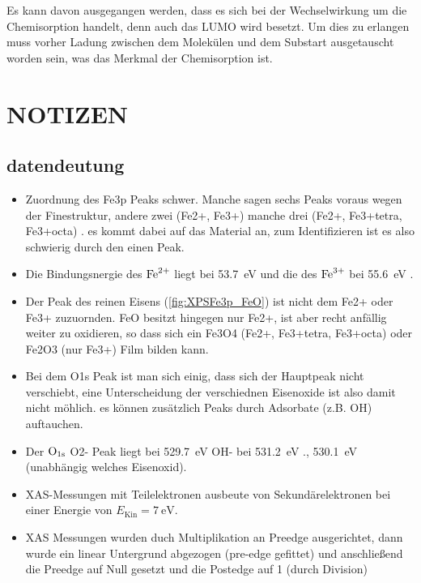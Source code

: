         Es kann davon ausgegangen werden, dass es sich bei der Wechselwirkung um die Chemisorption handelt, denn auch das LUMO wird besetzt.
        Um dies zu erlangen muss vorher Ladung zwischen dem Molekülen und dem Substart ausgetauscht worden sein, was das Merkmal der Chemisorption ist.

  
    \section{NOTIZEN}
    \subsection{datendeutung}
        \begin{itemize}
            \item Zuordnung des Fe3p Peaks schwer. Manche sagen sechs Peaks voraus \cite{FeO_14, FeO_17, FeO_15} wegen der Finestruktur, andere zwei (Fe2+, Fe3+) \cite{FeO_15, FeO_11, FeO_10, FeO_7} manche drei (Fe2+, Fe3+tetra, Fe3+octa) \cite{FeO_12}. es kommt dabei auf das Material an, zum Identifizieren ist es also schwierig durch den einen Peak.
            \item Die Bindungsnergie des $\ce{Fe}^{2+}$ liegt bei \SI{53.7}{\electronvolt} und die des $\ce{Fe}^{3+}$ bei \SI{55.6}{\electronvolt} \cite{FeO_7}.
            \item Der Peak des reinen Eisens (\autoref{fig:XPSFe3p_FeO}) ist nicht dem Fe2+ oder Fe3+ zuzuornden. FeO besitzt hingegen nur Fe2+, ist aber recht anfällig weiter zu oxidieren, so dass sich ein Fe3O4 (Fe2+, Fe3+tetra, Fe3+octa) oder Fe2O3 (nur Fe3+) Film bilden kann. 
            \item Bei dem O1s Peak ist man sich einig, dass sich der Hauptpeak nicht verschiebt, eine Unterscheidung der verschiednen Eisenoxide ist also damit nicht möhlich. es können zusätzlich Peaks durch Adsorbate (z.B. OH) auftauchen.
            \item Der  $\ce{O}_{1\text{s}}$ O2- Peak liegt bei \SI{529.7}{\electronvolt} \cite{FeO_9} OH- bei \SI{531.2}{\electronvolt} \cite{FeO_9}., \SI{530.1}{\electronvolt} \cite{FeO_15} (unabhängig welches Eisenoxid).
            \item XAS-Messungen mit Teilelektronen ausbeute von Sekundärelektronen bei einer Energie von $E_\text{Kin} = \SI{7}{\electronvolt}$.
            \item XAS Messungen wurden duch Multiplikation an Preedge ausgerichtet, dann wurde ein linear Untergrund abgezogen (pre-edge gefittet) und anschließend die Preedge auf Null gesetzt und die Postedge auf 1 (durch Division)

\end{itemize}
